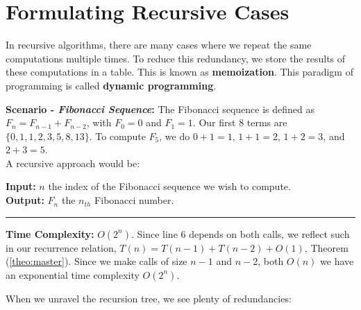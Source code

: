 \section{Formulating Recursive Cases}

\begin{Def}

In recursive algorithms, there are many cases where we repeat 
the same computations multiple times. To reduce this redundancy, we store 
the results of these computations in a table. This is known as \textbf{memoization}. This paradigm of programming is 
called \textbf{dynamic programming}.
\end{Def}
\textbf{Scenario - \textit{Fibonacci Sequence}:} The Fibonacci sequence is defined as $F_n=F_{n-1}+F_{n-2}$, with $F_0=0$ and $F_1=1$. Our 
first 8 terms are $\{0,1,1,2,3,5,8,13\}$. To compute $F_5$, we do $0+1=1$, $1+1=2$, $1+2=3$, and $2+3=5$.\\

\noindent
A recursive approach would be:

\begin{Func}
    \noindent
    \textbf{Input:} $n$ the index of the Fibonacci sequence we wish to compute.\\
    \textbf{Output:} $F_n$ the $n_{th}$ Fibonacci number.\\

    \vspace{-.5em}
    \begin{algorithm}[H]
        \SetAlgoLined
    \end{algorithm}
    \rule{\textwidth}{0.4pt}
    \textbf{Time Complexity:} $O(2^n)$. Since line 6 depends on both calls, we reflect such in our recurrence relation, $T(n)=T(n-1)+T(n-2)+O(1)$, Theorem (\ref{theo:master}). Since we make 
    calls of size $n-1$ and $n-2$, both $O(n)$ we have an exponential time complexity $O(2^n)$. 
\end{Func}

\newpage
\noindent
When we unravel the recursion tree, we see plenty of redundancies:

